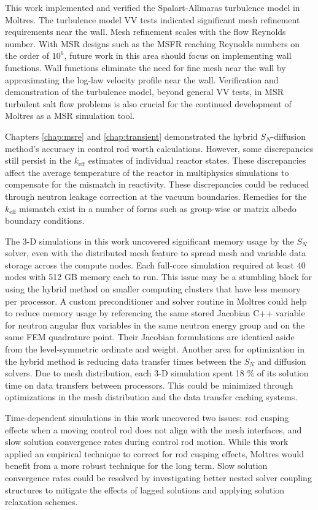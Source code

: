 This work implemented and verified the Spalart-Allmaras turbulence model in Moltres. The turbulence
model \gls{VV} tests indicated significant mesh refinement requirements near the wall. Mesh
refinement scales with the flow Reynolds number. With \gls{MSR} designs such as the \gls{MSFR}
reaching Reynolds numbers on the order of $10^6$, future work in this area should focus on
implementing wall functions. Wall functions eliminate the need for fine mesh near the wall by
approximating the log-law velocity profile near the wall. Verification and demonstration of the
turbulence model, beyond general \gls{VV} tests, in \gls{MSR} turbulent salt flow problems is also
crucial for the continued development of Moltres as a \gls{MSR} simulation tool.

Chapters \ref{chap:msre} and \ref{chap:transient} demonstrated the hybrid $S_N$-diffusion method's
accuracy in control rod worth calculations. However, some discrepancies still persist in the
$k_\text{eff}$ estimates of individual reactor states. These discrepancies affect the average
temperature of the reactor in multiphysics simulations to compensate for the mismatch in
reactivity. These discrepancies could be reduced through
neutron leakage correction at the vacuum boundaries. Remedies for the $k_\text{eff}$ mismatch
exist in a number of forms such as group-wise or matrix albedo boundary conditions.

The 3-D simulations in this work uncovered significant memory usage by the $S_N$ solver, even
with the distributed mesh feature to spread mesh and variable data storage across the compute nodes.
Each full-core simulation required at least 40 nodes with 512 GB memory each to run.
This issue may be a stumbling block for using the hybrid method on smaller computing clusters that
have less memory per processor. A custom preconditioner and solver routine in Moltres could help to
reduce memory usage by referencing the same stored Jacobian C++ variable for neutron angular flux
variables in the same neutron energy group and on the same \gls{FEM} quadrature point. Their
Jacobian formulations are identical aside from the level-symmetric ordinate and weight. Another
area for optimization in the hybrid method is reducing data transfer times between the $S_N$ and
diffusion solvers. Due to mesh distribution, each 3-D simulation spent 18 \% of its solution time
on data transfers between processors. This could be minimized through optimizations in the mesh
distribution and the data transfer caching systems.

Time-dependent simulations in this work uncovered two issues: rod cusping effects when a moving
control rod does not align with the mesh interfaces, and slow solution convergence rates during
control rod motion. While this work applied an empirical technique to correct for rod cusping
effects, Moltres would benefit from a more robust technique for the long term. Slow solution
convergence rates could be resolved by investigating better nested solver coupling structures to
mitigate the effects of lagged solutions and applying solution relaxation schemes.

